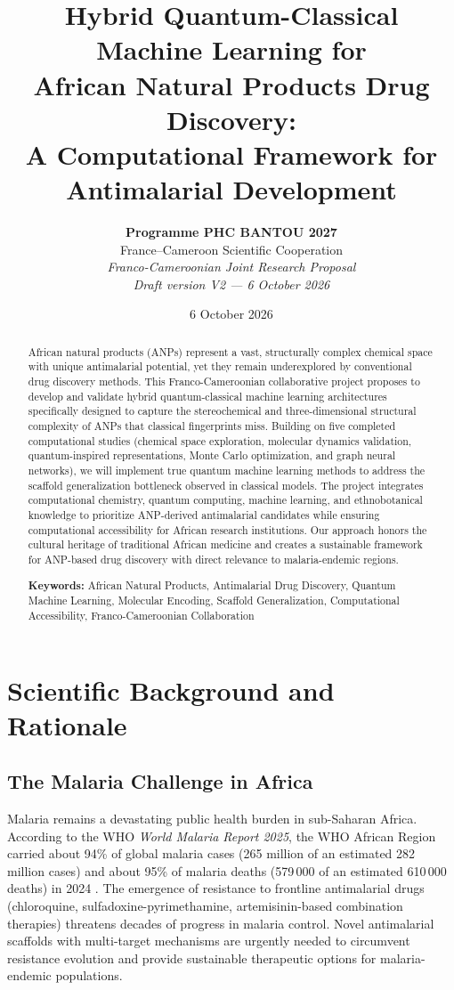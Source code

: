 \documentclass[11pt,a4paper]{article}
\title{\textbf{Hybrid Quantum-Classical Machine Learning for\\
African Natural Products Drug Discovery:\\
A Computational Framework for Antimalarial Development}}
\author{
    \textbf{Programme PHC BANTOU 2027}\\[0.5em]
    \normalsize France--Cameroon Scientific Cooperation\\[1em]
    \normalsize \textit{Franco-Cameroonian Joint Research Proposal}\\[0.5em]
    \normalsize \textit{Draft version V2 — 6 October 2026}
}
\date{6 October 2026}
\begin{document}
\thispagestyle{empty}
\maketitle

\begin{abstract}
\noindent
African natural products (ANPs) represent a vast, structurally complex chemical space with unique antimalarial potential, yet they remain underexplored by conventional drug discovery methods. This Franco-Cameroonian collaborative project proposes to develop and validate hybrid quantum-classical machine learning architectures specifically designed to capture the stereochemical and three-dimensional structural complexity of ANPs that classical fingerprints miss. Building on five completed computational studies (chemical space exploration, molecular dynamics validation, quantum-inspired representations, Monte Carlo optimization, and graph neural networks), we will implement true quantum machine learning methods to address the scaffold generalization bottleneck observed in classical models. The project integrates computational chemistry, quantum computing, machine learning, and ethnobotanical knowledge to prioritize ANP-derived antimalarial candidates while ensuring computational accessibility for African research institutions. Our approach honors the cultural heritage of traditional African medicine and creates a sustainable framework for ANP-based drug discovery with direct relevance to malaria-endemic regions.

\vspace{0.5em}
\noindent\textbf{Keywords:} African Natural Products, Antimalarial Drug Discovery, Quantum Machine Learning, Molecular Encoding, Scaffold Generalization, Computational Accessibility, Franco-Cameroonian Collaboration
\end{abstract}

\clearpage
\tableofcontents
\clearpage

\section{Scientific Background and Rationale}

\subsection{The Malaria Challenge in Africa}

Malaria remains a devastating public health burden in sub-Saharan Africa. According to the WHO \textit{World Malaria Report 2025}, the WHO African Region carried about 94\% of global malaria cases (265 million of an estimated 282 million cases) and about 95\% of malaria deaths (579\,000 of an estimated 610\,000 deaths) in 2024 \cite{who2025}. The emergence of resistance to frontline antimalarial drugs (chloroquine, sulfadoxine-pyrimethamine, artemisinin-based combination therapies) threatens decades of progress in malaria control. Novel antimalarial scaffolds with multi-target mechanisms are urgently needed to circumvent resistance evolution and provide sustainable therapeutic options for malaria-endemic populations.
\end{document}
